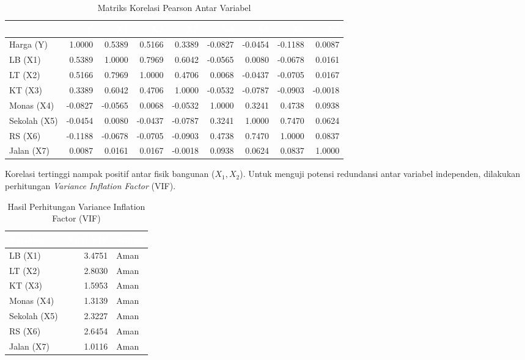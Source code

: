\documentclass[12pt,a4paper]{article}
\begin{document}
\begin{table}[H]
\centering
\caption{Matriks Korelasi Pearson Antar Variabel}
\label{tab:corr_full}
\scriptsize
\setlength{\tabcolsep}{5pt}
\begin{tabular}{lrrrrrrrr}
\toprule
\rowcolor{headerblue}
\textcolor{white}{\textbf{}} &
\textcolor{white}{\textbf{Y}} &
\textcolor{white}{\textbf{X1}} &
\textcolor{white}{\textbf{X2}} &
\textcolor{white}{\textbf{X3}} &
\textcolor{white}{\textbf{X4}} &
\textcolor{white}{\textbf{X5}} &
\textcolor{white}{\textbf{X6}} &
\textcolor{white}{\textbf{X7}} \\
\midrule
\rowcolor{rowlight}
Harga (Y) & 1.0000 & 0.5389 & 0.5166 & 0.3389 & -0.0827 & -0.0454 & -0.1188 & 0.0087 \\
LB (X1) & 0.5389 & 1.0000 & 0.7969 & 0.6042 & -0.0565 & 0.0080 & -0.0678 & 0.0161 \\
\rowcolor{rowlight}
LT (X2) & 0.5166 & 0.7969 & 1.0000 & 0.4706 & 0.0068 & -0.0437 & -0.0705 & 0.0167 \\
KT (X3) & 0.3389 & 0.6042 & 0.4706 & 1.0000 & -0.0532 & -0.0787 & -0.0903 & -0.0018 \\
\rowcolor{rowlight}
Monas (X4) & -0.0827 & -0.0565 & 0.0068 & -0.0532 & 1.0000 & 0.3241 & 0.4738 & 0.0938 \\
Sekolah (X5) & -0.0454 & 0.0080 & -0.0437 & -0.0787 & 0.3241 & 1.0000 & 0.7470 & 0.0624 \\
\rowcolor{rowlight}
RS (X6) & -0.1188 & -0.0678 & -0.0705 & -0.0903 & 0.4738 & 0.7470 & 1.0000 & 0.0837 \\
Jalan (X7) & 0.0087 & 0.0161 & 0.0167 & -0.0018 & 0.0938 & 0.0624 & 0.0837 & 1.0000 \\
\bottomrule
\end{tabular}
\end{table}

Korelasi tertinggi nampak positif antar fisik bangunan ($X_1, X_2$). Untuk menguji potensi redundansi antar variabel independen, dilakukan perhitungan \textit{Variance Inflation Factor} (VIF).

\begin{table}[H]
\centering
\caption{Hasil Perhitungan Variance Inflation Factor (VIF)}
\label{tab:vif}
\begin{tabular}{lrl}
\toprule
\rowcolor{headerblue}
\textcolor{white}{\textbf{Variabel}} & \textcolor{white}{\textbf{Nilai VIF}} & \textcolor{white}{\textbf{Status}} \\
\midrule
\rowcolor{rowlight}
LB (X1) & 3.4751 & Aman \\
LT (X2) & 2.8030 & Aman \\
\rowcolor{rowlight}
KT (X3) & 1.5953 & Aman \\
Monas (X4) & 1.3139 & Aman \\
\rowcolor{rowlight}
Sekolah (X5) & 2.3227 & Aman \\
RS (X6) & 2.6454 & Aman \\
\rowcolor{rowlight}
Jalan (X7) & 1.0116 & Aman \\
\bottomrule
\end{tabular}
\end{table}
\end{document}
